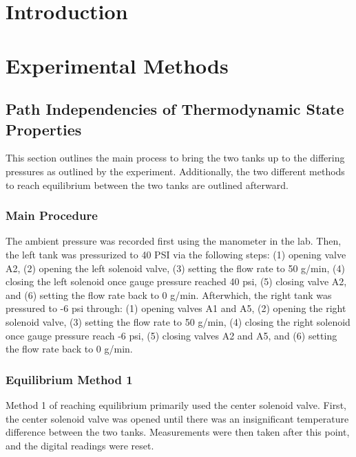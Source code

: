 \documentclass{article} %
\begin{document}
\begin{multicols}{2}

\section{Introduction}
\label{introduction}

\section{Experimental Methods}
\label{experimental_methods}

\subsection{Path Independencies of Thermodynamic State Properties}
\label{methods_path_independencies_thermodynamic_properties}

This section outlines the main process to bring the two tanks up to the differing pressures as outlined by the experiment.
Additionally, the two different methods to reach equilibrium between the two tanks are outlined afterward.

\subsubsection{Main Procedure}

The ambient pressure was recorded first using the manometer in the lab.
Then, the left tank was pressurized to 40 PSI via the following steps:
(1) opening valve A2, (2) opening the left solenoid valve, (3) setting the flow rate to 50 g/min, (4) closing the left solenoid once gauge pressure reached 40 psi, (5) closing valve A2, and (6) setting the flow rate back to 0 g/min.
Afterwhich, the right tank was pressured to -6 psi through:
(1) opening valves A1 and A5, (2) opening the right solenoid valve, (3) setting the flow rate to 50 g/min, (4) closing the right solenoid once gauge pressure reach -6 psi, (5) closing valves A2 and A5, and (6) setting the flow rate back to 0 g/min.

\subsubsection{Equilibrium Method 1}

Method 1 of reaching equilibrium primarily used the center solenoid valve.
First, the center solenoid valve was opened until there was an insignificant temperature difference between the two tanks.
Measurements were then taken after this point, and the digital readings were reset.


\end{multicols}
\end{document}
